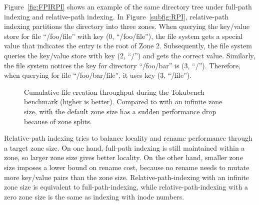Figure~\ref{fig:FPIRPI} shows an example of the same directory tree under
full-path indexing and relative-path indexing.
In Figure~\ref{subfig:RPI}, relative-path indexing partitions the directory
into three zones.
When querying the key/value store for file ``/foo/file'' with key
(0, ``/foo/file''), the file system gets a special value that
indicates the entry is the root of Zone 2.
Subsequently, the file system queries the key/value store with key (2, ``/'')
and gets the correct value.
Similarly, the file system notices the key for directory ``/foo/bar'' is
(3, ``/'').
Therefore, when querying for file ``/foo/bar/file'', it uses key (3, ``/file'').

\newcommand{\addTokubenchZonePlot}[1]
{
    \addplot[
        color=\pgfkeysvalueof{/fs-colors/#1},
        line width=0.75pt,
        mark=\pgfkeysvalueof{/fs-marks/#1},
    ]
    plot[
    ]
    table[
    ]
    {./data/tokuzone/#1.csv};
    \addlegendentry{\pgfkeysvalueof{/fs-names/#1}}
}

\begin{figure}[t]
    \centering
    \caption[Zone maintainance cost in TokuBench benchmark]{
        Cumulative file creation throughput during the Tokubench benchmark (higher is better).
        Compared to \betrfsThree with an infinite zone size,
        \betrfsThree with the default zone size has a sudden
        performance drop because of zone splits.}
    \label{fig:tokuzone}
\end{figure}

Relative-path indexing tries to balance locality and rename performance through
a target zone size.
On one hand, full-path indexing is still maintained within a zone,
so larger zone size gives better locality.
On the other hand, smaller zone size imposes a lower bound on rename cost,
because no rename needs to mutate more key/value pairs than the zone size.
Relative-path-indexing with an infinite zone size is equivalent to
full-path-indexing, while relative-path-indexing with a zero zone size is the
same as indexing with inode numbers.

